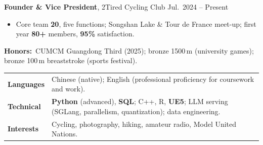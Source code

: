 \documentclass[9pt,letterpaper]{article}
\begin{document}
\vspace{0.08em}
\noindent\textbf{Founder \& Vice President}, 2Tired Cycling Club \hfill {\normalsize Jul.\ 2024 -- Present}
\begin{itemize}
  \item Core team \textbf{20}, five functions; Songshan Lake \& Tour de France meet-up; first year \textbf{80+} members, \textbf{95\%} satisfaction.
\end{itemize}

\vspace{0.1em}
\noindent\textbf{Honors:}\ {\small CUMCM Guangdong Third (2025); bronze 1500\,m (university games); bronze 100\,m breaststroke (sports festival).}

\vspace{0.2em}
\noindent\small
\begin{tabularx}{\linewidth}{@{}p{3.45em}Y@{}}
  \textbf{Languages} & Chinese (native); English (professional proficiency for coursework and work). \\[0.06em]
  \textbf{Technical} & \textbf{Python} (advanced), \textbf{SQL}; C++, R, \textbf{UE5}; LLM serving (SGLang, parallelism, quantization); data engineering. \\[0.06em]
  \textbf{Interests} & Cycling, photography, hiking, amateur radio, Model United Nations. \\
\end{tabularx}
\end{document}
